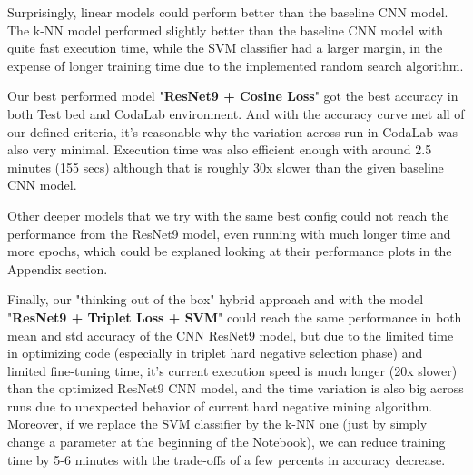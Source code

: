 \documentclass[10pt,twocolumn,letterpaper]{article}
\begin{document}
Surprisingly, linear models could perform better than the baseline CNN model. The k-NN model performed slightly better than the baseline CNN model with quite fast execution time, while the SVM classifier had a larger margin, in the expense of longer training time due to the implemented random search algorithm.

Our best performed model "\textbf{ResNet9 + Cosine Loss}" got the best accuracy in both Test bed and CodaLab environment. And with the accuracy curve met all of our defined criteria, it's reasonable why the variation across run in CodaLab was also very minimal. Execution time was also efficient enough with around 2.5 minutes (155 secs) although that is roughly 30x slower than the given baseline CNN model.

Other deeper models that we try with the same best config could not reach the performance from the ResNet9 model, even running with much longer time and more epochs, which could be explaned looking at their performance plots in the Appendix section.

Finally, our "thinking out of the box" hybrid approach and with the model "\textbf{ResNet9 + Triplet Loss + SVM}" could reach the same performance in both mean and std accuracy of the CNN ResNet9 model, but due to the limited time in optimizing code (especially in triplet hard negative selection phase) and limited fine-tuning time, it's current execution speed is much longer (20x slower) than the optimized ResNet9 CNN model, and the time variation is also big across runs due to unexpected behavior of current hard negative mining algorithm. Moreover, if we replace the SVM classifier by the k-NN one (just by simply change a parameter at the beginning of the Notebook), we can reduce training time by 5-6 minutes with the trade-offs of a few percents in accuracy decrease.     
\end{document}
